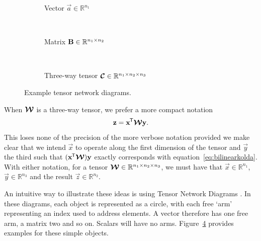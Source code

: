 \begin{figure}
	\centering
	\begin{subfigure}[t]{0.45\textwidth}
	\centering
	\caption{Vector \(\vec{a}\in\mathbb{R}^{n_1}\)}\label{fig:tnd:vec}
	\end{subfigure} ~
	\begin{subfigure}[t]{0.45\textwidth}
	\centering
	\caption{Matrix \(\mathbf{B}\in\mathbb{R}^{n_1 \times n_2}\)}\label{fig:tnd:mat}
	\end{subfigure} \\
	
	\begin{subfigure}[t]{0.5\textwidth}
	\centering
	\caption{Three-way tensor 
		\(\bm{\mathcal{C}}\in\mathbb{R}^{n_1\times n_2\times n_3}\)}\label{fig:tnd:3ten}
	\end{subfigure}
	\caption{Example tensor network diagrams.}
	\label{fig:tnegs}
\end{figure}

When \(\bm{\mathcal{W}}\) is a three-way tensor, we prefer a more compact notation
\begin{equation}\label{eq:bilintensor}
	\mathbf{z} = \mathbf{x}^{\mkern-1.5mu\mathsf{T}}\bm{\mathcal{W}}\mathbf{y}.
\end{equation} This loses none of the precision of the more verbose notation provided we make clear
that we intend \(\vec{x}\) to operate along the first dimension of the tensor and \(\vec{y}\) the
third such that \((\mathbf{x}^{\mkern-1.5mu\mathsf{T}}\bm{\mathcal{W}})\mathbf{y}\) exactly corresponds with 
equation~\eqref{eq:bilinearkolda}. With either notation, for a tensor 
\(\bm{\mathcal{W}} \in \mathbb{R}^{n_1 \times n_2 \times n_3}\), we must have that 
\(\vec{x}\in \mathbb{R}^{n_1}\), \(\vec{y} \in \mathbb{R}^{n_3}\) and the result 
\(\vec{z}\in\mathbb{R}^{n_2}\).

An intuitive way to illustrate these ideas is using Tensor Network Diagrams
\autocite{Cichocki2016, Orus2014}. In these diagrams, each object is represented
as a circle, with each free `arm' representing an index used to address elements.
A vector therefore has one free arm, a matrix two and so on. Scalars will have
no arms. Figure~\ref{fig:tnegs} provides examples for these simple objects. 


